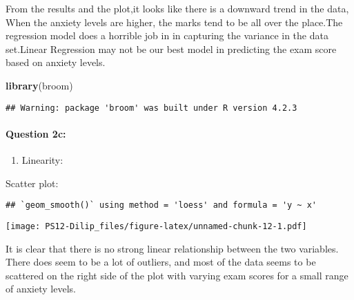 \documentclass[
]{article}
\newenvironment{Shaded}{\begin{snugshade}}{\end{snugshade}}
\newcommand{\FunctionTok}[1]{\textcolor[rgb]{0.13,0.29,0.53}{\textbf{#1}}}
\newcommand{\NormalTok}[1]{#1}
\newcommand{\OtherTok}[1]{\textcolor[rgb]{0.56,0.35,0.01}{#1}}
\newcommand{\SpecialCharTok}[1]{\textcolor[rgb]{0.81,0.36,0.00}{\textbf{#1}}}
\providecommand{\tightlist}{%
  \setlength{\itemsep}{0pt}\setlength{\parskip}{0pt}}
\begin{document}
From the results and the plot,it looks like there is a downward trend in
the data, When the anxiety levels are higher, the marks tend to be all
over the place.The regression model does a horrible job in in capturing
the variance in the data set.Linear Regression may not be our best model
in predicting the exam score based on anxiety levels.

\begin{Shaded}
\begin{Highlighting}[]
\FunctionTok{library}\NormalTok{(broom)}
\end{Highlighting}
\end{Shaded}

\begin{verbatim}
## Warning: package 'broom' was built under R version 4.2.3
\end{verbatim}

\hypertarget{question-2c}{%
\paragraph{Question 2c:}\label{question-2c}}

\begin{enumerate}
\def\labelenumi{\roman{enumi}.}
\tightlist
\item
  Linearity:
\end{enumerate}

Scatter plot:

\begin{Shaded}
\end{Shaded}

\begin{verbatim}
## `geom_smooth()` using method = 'loess' and formula = 'y ~ x'
\end{verbatim}

\texttt{[image: PS12-Dilip\_files/figure-latex/unnamed-chunk-12-1.pdf]}

It is clear that there is no strong linear relationship between the two
variables. There does seem to be a lot of outliers, and most of the data
seems to be scattered on the right side of the plot with varying exam
scores for a small range of anxiety levels.
\end{document}
